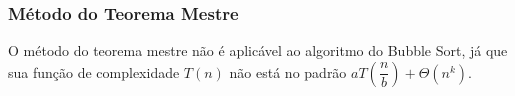 \subsubsection{Método do Teorema Mestre}
O método do teorema mestre não é aplicável ao algoritmo do Bubble Sort, já que sua função de complexidade $T(n)$ não está no padrão \(aT
\left( \dfrac{n}{b} \right) + \Theta\left(n^k\right)\).
